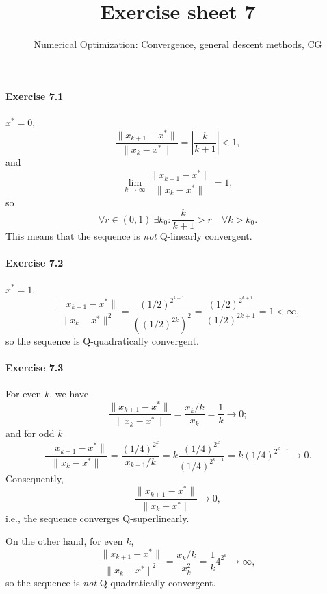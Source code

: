 
\title{Exercise sheet 7}
\subtitle{Numerical Optimization: Convergence, general descent methods, CG}
\usepackage{algorithm} %
\usepackage{algpseudocode}

\maketitle

\paragraph{Exercise 7.1} %
$x^* = 0$,
\[
\frac{\|x_{k+1}-x^*\|}{\|x_k-x^*\|} = \left|\frac{k}{k+1}\right| < 1,
\]
and
\[
\lim_{k\to\infty} \frac{\|x_{k+1}-x^*\|}{\|x_k-x^*\|} = 1,
\]
so
\[
\forall r\in(0,1)\: \exists k_0: \frac{k}{k+1} > r \quad\forall k>k_0.
\]
This means that the sequence is \emph{not} Q-linearly convergent.


\paragraph{Exercise 7.2} %
$x^* = 1$,
\[
\frac{\|x_{k+1}-x^*\|}{\|x_k-x^*\|^2}
= \frac{(1/2)^{2^{k+1}}}{((1/2)^{2k})^2}
= \frac{(1/2)^{2^{k+1}}}{(1/2)^{2k+1}}
= 1 < \infty,
\]
so the sequence is Q-quadratically convergent.


\paragraph{Exercise 7.3} %
For even $k$, we have
\[
\frac{\|x_{k+1}-x^*\|}{\|x_k-x^*\|}
= \frac{x_k/k}{x_k}
= \frac{1}{k}
\to 0;
\]
and for odd $k$
\[
\frac{\|x_{k+1}-x^*\|}{\|x_k-x^*\|}
= \frac{(1/4)^{2^k}}{x_{k-1}/k}
= k \frac{(1/4)^{2^k}}{(1/4)^{2^{k-1}}}
= k (1/4)^{2^{k-1}}
\to 0.
\]
Consequently,
\[
\frac{\|x_{k+1}-x^*\|}{\|x_k-x^*\|} \to 0,
\]
i.e., the sequence converges Q-superlinearly.

On the other hand, for even $k$,
\[
\frac{\|x_{k+1}-x^*\|}{\|x_k-x^*\|^2}
= \frac{x_k/k}{x_k^2} = \frac{1}{k}4^{2^k} \to \infty,
\]
so the sequence is \emph{not} Q-quadratically convergent.


